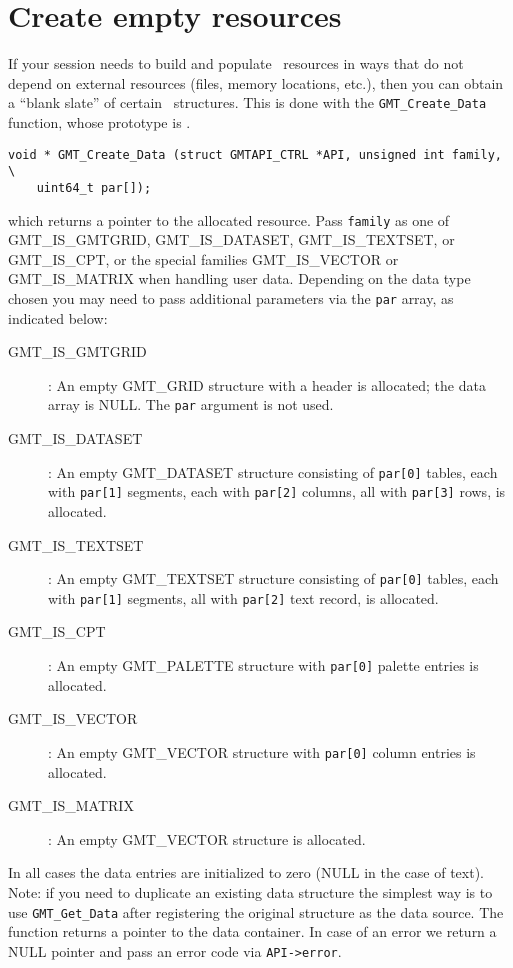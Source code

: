 \documentclass[11pt]{report}
\begin{document}
\section{Create empty resources}
\label{sec:create}

If your session needs to build and populate \GMT\ resources in ways that do
not depend on external resources (files, memory locations, etc.), then you
can obtain a ``blank slate'' of certain \GMT\ structures.  
This is done with the \texttt{GMT\_Create\_Data} function, whose prototype is
.

\begin{verbatim}
void * GMT_Create_Data (struct GMTAPI_CTRL *API, unsigned int family, \
    uint64_t par[]);
\end{verbatim}
which returns a pointer to the allocated resource.
Pass \texttt{family} as one of GMT\_IS\_GMTGRID, GMT\_IS\_DATASET, GMT\_IS\_TEXTSET, or GMT\_IS\_CPT,
or the special families GMT\_IS\_VECTOR or GMT\_IS\_MATRIX when handling user data.
Depending on the data type chosen you may need to pass additional parameters via
the \texttt{par} array, as indicated below:
\begin{description}
	\item [GMT\_IS\_GMTGRID]: An empty GMT\_GRID structure with a header is
	allocated; the data array is NULL.  The \texttt{par} argument is not used.
	\item [GMT\_IS\_DATASET]: An empty GMT\_DATASET structure consisting of
	\texttt{par[0]} tables, each with \texttt{par[1]} segments, each with
	\texttt{par[2]} columns, all with \texttt{par[3]} rows, is allocated.
	\item [GMT\_IS\_TEXTSET]: An empty GMT\_TEXTSET structure consisting of
	\texttt{par[0]} tables, each with \texttt{par[1]} segments,
	all with \texttt{par[2]} text record, is allocated.
	\item [GMT\_IS\_CPT]: An empty GMT\_PALETTE structure with \texttt{par[0]}
	palette entries is allocated.
	\item [GMT\_IS\_VECTOR]: An empty GMT\_VECTOR structure with \texttt{par[0]}
	column entries is allocated.
	\item [GMT\_IS\_MATRIX]: An empty GMT\_VECTOR structure is allocated.
\end{description}
In all cases the data entries are initialized to zero (NULL in the case of text).
Note: if you need to
duplicate an existing data structure the simplest way is to use \texttt{GMT\_Get\_Data}
after registering the original structure as the data source.
The function returns a pointer to the data container. In case of an error we return a
NULL pointer and pass an error code via \texttt{API->error}.
\end{document}

